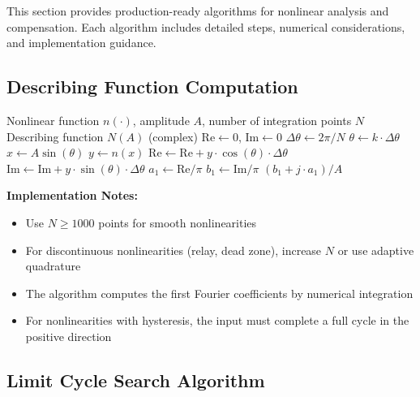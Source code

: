 This section provides production-ready algorithms for nonlinear analysis and compensation. Each algorithm includes detailed steps, numerical considerations, and implementation guidance.

\subsection{Describing Function Computation}

\begin{algorithm}[H]
\caption{Numerical Describing Function Calculation}
\label{alg:describing_function}
\begin{algorithmic}[1]
\REQUIRE Nonlinear function $n(\cdot)$, amplitude $A$, number of integration points $N$
\ENSURE Describing function $N(A)$ (complex)
\STATE $\text{Re} \gets 0$, $\text{Im} \gets 0$
\STATE $\Delta\theta \gets 2\pi / N$
    \STATE $\theta \gets k \cdot \Delta\theta$
    \STATE $x \gets A \sin(\theta)$
    \STATE $y \gets n(x)$
    \STATE $\text{Re} \gets \text{Re} + y \cdot \cos(\theta) \cdot \Delta\theta$
    \STATE $\text{Im} \gets \text{Im} + y \cdot \sin(\theta) \cdot \Delta\theta$
\ENDFOR
\STATE $a_1 \gets \text{Re} / \pi$
\STATE $b_1 \gets \text{Im} / \pi$
\RETURN $(b_1 + j \cdot a_1) / A$
\end{algorithmic}
\end{algorithm}

\textbf{Implementation Notes:}
\begin{itemize}
    \item Use $N \geq 1000$ points for smooth nonlinearities
    \item For discontinuous nonlinearities (relay, dead zone), increase $N$ or use adaptive quadrature
    \item The algorithm computes the first Fourier coefficients by numerical integration
    \item For nonlinearities with hysteresis, the input must complete a full cycle in the positive direction
\end{itemize}

\subsection{Limit Cycle Search Algorithm}

